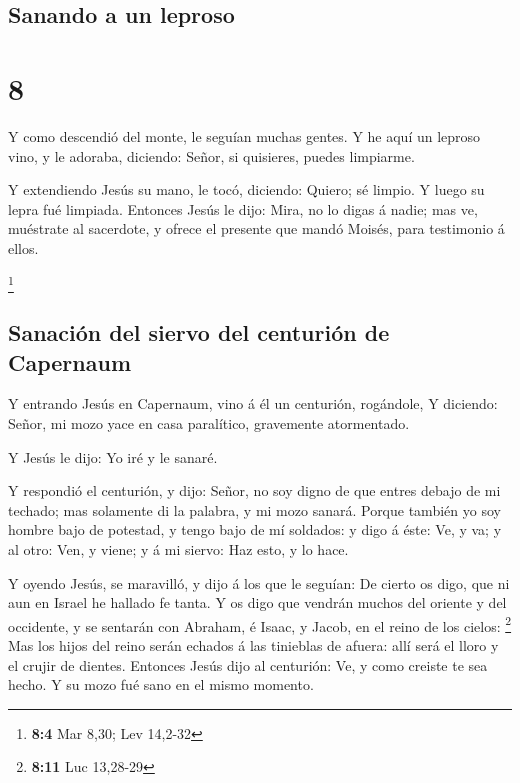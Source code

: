\hypertarget{sanando-a-un-leproso}{%
\subsection{Sanando a un leproso}\label{sanando-a-un-leproso}}

\hypertarget{section-7}{%
\section{8}\label{section-7}}

 Y como descendió del monte, le seguían muchas gentes.
 Y he aquí un leproso vino, y le adoraba, diciendo: Señor,
si quisieres, puedes limpiarme.

 Y extendiendo Jesús su mano, le tocó, diciendo: Quiero;
sé limpio. Y luego su lepra fué limpiada.  Entonces Jesús
le dijo: Mira, no lo digas á nadie; mas ve, muéstrate al sacerdote, y
ofrece el presente que mandó Moisés, para testimonio á ellos.

\footnote{\textbf{8:4} Mar 8,30; Lev 14,2-32}

\hypertarget{sanaciuxf3n-del-siervo-del-centuriuxf3n-de-capernaum}{%
\subsection{Sanación del siervo del centurión de
Capernaum}\label{sanaciuxf3n-del-siervo-del-centuriuxf3n-de-capernaum}}

 Y entrando Jesús en Capernaum, vino á él un centurión,
rogándole,  Y diciendo: Señor, mi mozo yace en casa
paralítico, gravemente atormentado.

 Y Jesús le dijo: Yo iré y le sanaré.

 Y respondió el centurión, y dijo: Señor, no soy digno de
que entres debajo de mi techado; mas solamente di la palabra, y mi mozo
sanará.  Porque también yo soy hombre bajo de potestad, y
tengo bajo de mí soldados: y digo á éste: Ve, y va; y al otro: Ven, y
viene; y á mi siervo: Haz esto, y lo hace.

 Y oyendo Jesús, se maravilló, y dijo á los que le
seguían: De cierto os digo, que ni aun en Israel he hallado fe tanta.
 Y os digo que vendrán muchos del oriente y del
occidente, y se sentarán con Abraham, é Isaac, y Jacob, en el reino de
los cielos: \footnote{\textbf{8:11} Luc 13,28-29}  Mas
los hijos del reino serán echados á las tinieblas de afuera: allí será
el lloro y el crujir de dientes.  Entonces Jesús dijo al
centurión: Ve, y como creiste te sea hecho. Y su mozo fué sano en el
mismo momento.

